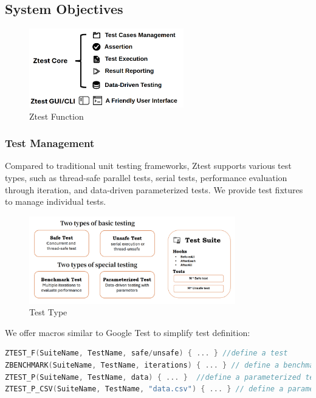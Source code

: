 \documentclass{article}
\begin{document}
\subsection{System Objectives}
\begin{figure}[H]
    \centering
    \includegraphics[width=0.6\textwidth]{img/func.png} %
    \caption{ Ztest Function}
    \label{fig:ztest function }
\end{figure}
\subsubsection{Test Management}
Compared to traditional unit testing frameworks, Ztest supports various test types, such as thread-safe parallel tests, serial tests, performance evaluation through iteration, and data-driven parameterized tests. We provide test fixtures to manage individual tests.

\begin{figure}[H]
    \centering
    \includegraphics[width=0.8\textwidth]{img/types.png} %
    \caption{ Test Type}
    \label{fig:test types }
\end{figure}
We offer macros similar to Google Test to simplify test definition:
\begin{framed}
    \begin{lstlisting}[language=C++]
ZTEST_F(SuiteName, TestName, safe/unsafe) { ... } //define a test 
ZBENCHMARK(SuiteName, TestName, iterations) { ... } // define a benchmark
ZTEST_P(SuiteName, TestName, data) { ... }  //define a parameterized test
ZTEST_P_CSV(SuiteName, TestName, "data.csv") { ... } // define a parameterized test with csv data
\end{lstlisting}
\end{framed}
\end{document}
